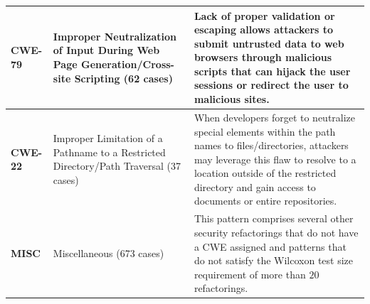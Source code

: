 \documentclass[10pt,conference]{IEEEtran}
\begin{document}
\begin{table}[h]
\begin{tabular}{L{1.1cm}L{2.1cm}L{4.3cm}}
 	     	           \textbf{CWE-79} & 
Improper Neutralization of Input During Web Page Generation/Cross-site Scripting (62 cases)& 
Lack of proper validation or escaping
 	    allows attackers to submit untrusted data to web browsers through malicious
 	    scripts that can hijack the user sessions or redirect the user to malicious
 	    sites.\\\midrule

 	     	           \textbf{CWE-22} & 
Improper Limitation of a Pathname to a Restricted Directory/Path Traversal (37 cases) & 
When developers forget to neutralize special elements within the path names to files/directories, attackers
 	may leverage this flaw to resolve to a location outside of the restricted directory and gain access to documents
 	or entire repositories.\\\midrule
 	
 	 	     	           \textbf{MISC} & 
Miscellaneous (673 cases) & 
This pattern comprises
 		several other security refactorings that do not have a CWE assigned and patterns that
 		do not satisfy the Wilcoxon test size requirement of more than $20$ refactorings.\\
\bottomrule
\end{tabular}
\label{tab:patterns}
\end{table}
\end{document}
